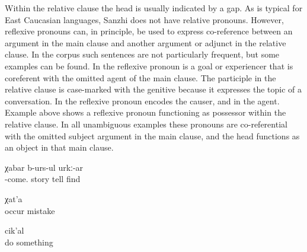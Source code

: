 Within the relative clause the head is usually indicated by a gap. As is typical for East Caucasian languages, Sanzhi does not have relative pronouns. However, reflexive pronouns can, in principle, be used to express co-reference between an argument in the main clause and another argument or adjunct in the relative clause. In the corpus such sentences are not particularly frequent, but some examples can be found. In  the reflexive pronoun is a goal or experiencer that is coreferent with the omitted agent of the main clause. The participle in the relative clause is case-marked with the genitive because it expresses the topic of a conversation. In  the reflexive pronoun encodes the causer, and in  the agent. Example  above shows a reflexive pronoun functioning as possessor within the relative clause. In all unambiguous examples these pronouns are co-referential with the omitted subject argument in the main clause, and the head functions as an object in that main clause.
%
\begin{exe}
	\ex	\label{ex:He is probably telling the story about what he had experienced}
		χabar	b-urs-ul	urkː-ar	\\
			-come.	story	tell	find\\
	\glt	{}

	\ex	\label{ex:the mistakes that were caused by him}
		χat'a\\
			occur	mistake\\
	\glt	{}

	\ex	\label{ex:(he is remembering) the things that he had done}
		cik'al\\
			do 	something\\
	\glt	{}
\end{exe}

